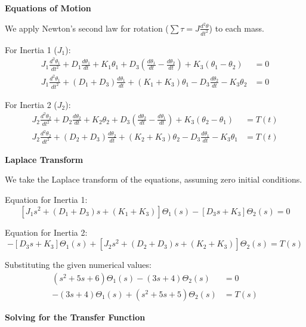 \documentclass[11pt]{article}
\begin{document}
\noindent\textbf{Equations of Motion}

\vspace{8pt}

\noindent We apply Newton's second law for rotation ($\sum \tau = J \frac{d^2\theta}{dt^2}$) to each mass.

\vspace{8pt}

{For Inertia 1 ($J_1$):}
\begin{align*}
    J_1 \frac{d^2\theta_1}{dt^2} + D_1 \frac{d\theta_1}{dt} + K_1 \theta_1 + D_3\left(\frac{d\theta_1}{dt} - \frac{d\theta_2}{dt}\right) + K_{3}(\theta_1 - \theta_2) &= 0 \\
    J_1 \frac{d^2\theta_1}{dt^2} + (D_1 + D_3)\frac{d\theta_1}{dt} + (K_1 + K_{3})\theta_1 - D_{3}\frac{d\theta_2}{dt} - K_{3}\theta_2 &= 0
\end{align*}

{For Inertia 2 ($J_2$):}
\begin{align*}
    J_2 \frac{d^2\theta_2}{dt^2} + D_2 \frac{d\theta_2}{dt} + K_2 \theta_2 + D_{3}\left(\frac{d\theta_2}{dt} - \frac{d\theta_1}{dt}\right) + K_{3}(\theta_2 - \theta_1) &= T(t) \\
    J_2 \frac{d^2\theta_2}{dt^2} + (D_2 + D_{3})\frac{d\theta_2}{dt} + (K_2 + K_{3})\theta_2 - D_{3}\frac{d\theta_1}{dt} - K_{3}\theta_1 &= T(t)
\end{align*}

\newpage
\noindent\textbf{Laplace Transform}

\vspace{12pt}

We take the Laplace transform of the equations, assuming zero initial conditions.

\vspace{8pt}

Equation for Inertia 1:
\[
[J_1 s^2 + (D_1 + D_{3})s + (K_1 + K_{3})]\Theta_1(s) - [D_{3}s + K_{3}]\Theta_2(s) = 0
\]

Equation for Inertia 2:
\[
-[D_{3}s + K_{3}]\Theta_1(s) + [J_2 s^2 + (D_2 + D_{3})s + (K_2 + K_{3})]\Theta_2(s) = T(s)
\]

Substituting the given numerical values:
\begin{align}
    (s^2 + 5s + 6)\Theta_1(s) - (3s + 4)\Theta_2(s) &= 0 \tag{1} \\
    -(3s + 4)\Theta_1(s) + (s^2 + 5s + 5)\Theta_2(s) &= T(s) \tag{2}
\end{align}

\noindent\textbf{Solving for the Transfer Function}
\vspace{8pt}
\end{document}
